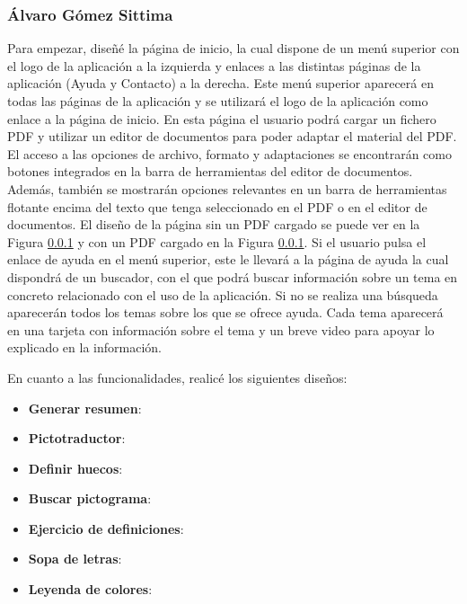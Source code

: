 \subsubsection{Álvaro Gómez Sittima}
Para empezar, diseñé la página de inicio, la cual dispone de un menú superior con el logo de la aplicación a la izquierda y enlaces a las distintas páginas de la aplicación (Ayuda y Contacto) a la derecha. Este menú superior aparecerá en todas las páginas de la aplicación y se utilizará el logo de la aplicación como enlace a la página de inicio. En esta página el usuario podrá cargar un fichero PDF y utilizar un editor de documentos para poder adaptar el material del PDF. El acceso a las opciones de archivo, formato y adaptaciones se encontrarán como botones integrados en la barra de herramientas del editor de documentos. Además, también se mostrarán opciones relevantes en un barra de herramientas flotante encima del texto que tenga seleccionado en el PDF o en el editor de documentos. El diseño de la página sin un PDF cargado se puede ver en la Figura \ref{} y con un PDF cargado en la Figura \ref{}. Si el usuario pulsa el enlace de ayuda en el menú superior, este le llevará a la página de ayuda la cual dispondrá de un buscador, con el que podrá buscar información sobre un tema en concreto relacionado con el uso de la aplicación. Si no se realiza una búsqueda aparecerán todos los temas sobre los que se ofrece ayuda. Cada tema aparecerá en una tarjeta con información sobre el tema y un breve video para apoyar lo explicado en la información.

En cuanto a las funcionalidades, realicé los siguientes diseños:
\begin{itemize}
  \item \textbf{Generar resumen}:
  \item \textbf{Pictotraductor}:
  \item \textbf{Definir huecos}:
  \item \textbf{Buscar pictograma}:
  \item \textbf{Ejercicio de definiciones}:
  \item \textbf{Sopa de letras}:
  \item \textbf{Leyenda de colores}:
\end{itemize}

